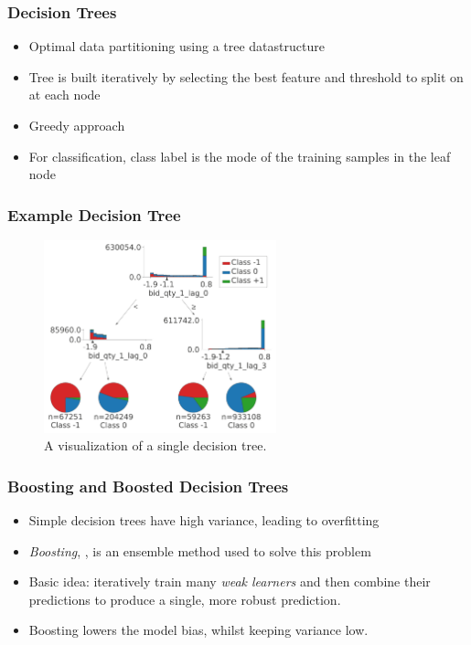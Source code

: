 \documentclass[handout]{beamer}
\begin{document}
\begin{frame}
    \frametitle{Decision Trees}
     \begin{itemize}
        \item Optimal data partitioning using a tree datastructure
        \item Tree is built iteratively by selecting the best feature and threshold to split on at each node
        \item Greedy approach
        \item For classification, class label is the mode of the training samples in the leaf node
    \end{itemize}
    
\end{frame}

\begin{frame}
    \frametitle{Example Decision Tree}
        \begin{figure}[ht]
            \centering
            \includegraphics[width=0.6\textwidth]{./images/xgb_viz.pdf}
            \caption{A visualization of a single decision tree.}
            \label{fig:weaklearner}
        \end{figure}
\end{frame}

\begin{frame}
    \frametitle{Boosting and Boosted Decision Trees}
     \begin{itemize}
         \item Simple decision trees have high variance, leading to overfitting
         \item \textit{Boosting}, {\color{blue}\cite{HASTIE2001}}, is an ensemble method used to solve this problem
        \item Basic idea: iteratively train many \textit{weak learners} and then combine their predictions to produce a single, more robust prediction. 
        \item Boosting lowers the model bias, whilst keeping variance low.
    \end{itemize}
\end{frame}
\end{document}
